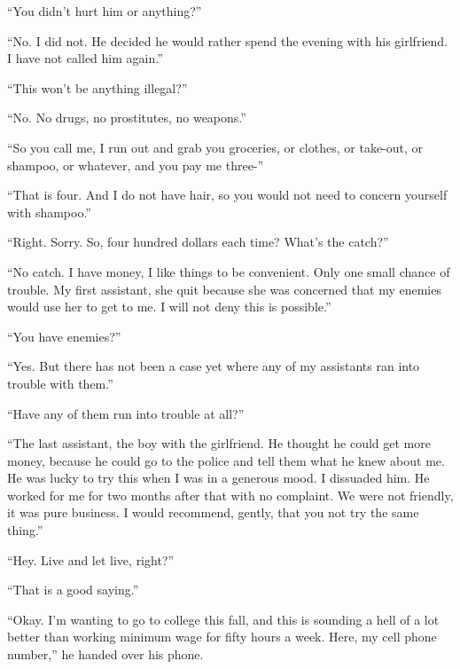 ``You didn't hurt him or anything?''



``No.  I did not.  He decided he would rather spend the evening with his girlfriend.  I have not called him again.''



``This won't be anything illegal?''



``No.  No drugs, no prostitutes, no weapons.''



``So you call me, I run out and grab you groceries, or clothes, or take-out, or shampoo, or whatever, and you pay me three-''



``That is four.  And I do not have hair, so you would not need to concern yourself with shampoo.''



``Right.  Sorry.  So, four hundred dollars each time?  What's the catch?''



``No catch.  I have money, I like things to be convenient.  Only one small chance of trouble.  My first assistant, she quit because she was concerned that my enemies would use her to get to me.  I will not deny this is possible.''



``You have enemies?''



``Yes.  But there has not been a case yet where any of my assistants ran into trouble with them.''



``Have any of them run into trouble at all?''



``The last assistant, the boy with the girlfriend.  He thought he could get more money, because he could go to the police and tell them what he knew about me.  He was lucky to try this when I was in a generous mood.  I dissuaded him.  He worked for me for two months after that with no complaint.  We were not friendly, it was pure business.  I would recommend, gently, that you not try the same thing.''



``Hey.  Live and let live, right?''



``That is a good saying.''



``Okay.  I'm wanting to go to college this fall, and this is sounding a hell of a lot better than working minimum wage for fifty hours a week.  Here, my cell phone number,'' he handed over his phone.




